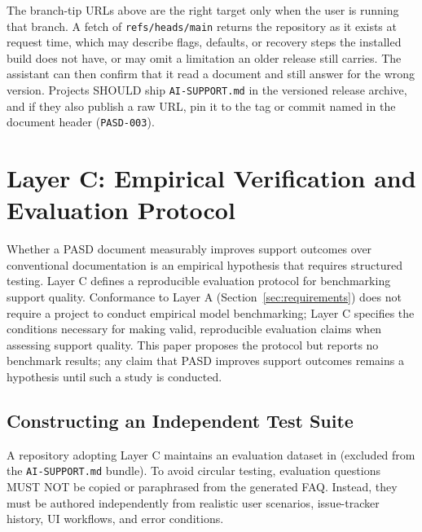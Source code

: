\documentclass[12pt, a4paper]{article}
\begin{document}
The branch-tip URLs above are the right target only when the user is running that branch. A fetch of \texttt{refs/heads/main} returns the repository as it exists at request time, which may describe flags, defaults, or recovery steps the installed build does not have, or may omit a limitation an older release still carries. The assistant can then confirm that it read a document and still answer for the wrong version. Projects SHOULD ship \texttt{AI-SUPPORT.md} in the versioned release archive, and if they also publish a raw URL, pin it to the tag or commit named in the document header (\texttt{PASD-003}).


\section{Layer C: Empirical Verification and Evaluation Protocol}
\label{sec:verification}

Whether a PASD document measurably improves support outcomes over conventional documentation is an empirical hypothesis that requires structured testing. Layer C defines a reproducible evaluation protocol for benchmarking support quality. Conformance to Layer A (Section~\ref{sec:requirements}) does not require a project to conduct empirical model benchmarking; Layer C specifies the conditions necessary for making valid, reproducible evaluation claims when assessing support quality. This paper proposes the protocol but reports no benchmark results; any claim that PASD improves support outcomes remains a hypothesis until such a study is conducted.

\subsection{Constructing an Independent Test Suite}
A repository adopting Layer C maintains an evaluation dataset in  (excluded from the \texttt{AI-SUPPORT.md} bundle). To avoid circular testing, evaluation questions MUST NOT be copied or paraphrased from the generated FAQ. Instead, they must be authored independently from realistic user scenarios, issue-tracker history, UI workflows, and error conditions.
\end{document}
